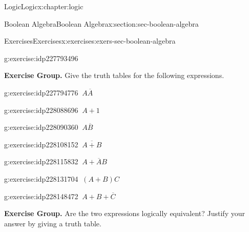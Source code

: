 \documentclass[twoside,10pt,]{book}
\numberwithin{equation}{section}
\begin{document}
\begin{chapterptx}{Logic}{}{Logic}{}{}{x:chapter:logic}
\begin{sectionptx}{Boolean Algebra}{}{Boolean Algebra}{}{}{x:section:sec-boolean-algebra}
\begin{exercises-subsection}{Exercises}{}{Exercises}{}{}{x:exercises:exers-sec-boolean-algebra}
\begin{exercisegroup}
\begin{divisionexerciseeg}{17}{}{}{g:exercise:idp227793496}
\begin{image}{0.3}{0.4}{0.3}%
%
\end{image}%
\end{divisionexerciseeg}%
\end{exercisegroup}
\par\medskip\noindent
\par\medskip\noindent%
\textbf{Exercise Group.}\space\space%
Give the truth tables for the following expressions.\begin{exercisegroup}
\begin{divisionexerciseeg}{18}{}{}{g:exercise:idp227794776}%
\(\ A\overline{A}\)\end{divisionexerciseeg}%
\begin{divisionexerciseeg}{19}{}{}{g:exercise:idp228088696}%
\(\ A+1\)\end{divisionexerciseeg}%
\begin{divisionexerciseeg}{20}{}{}{g:exercise:idp228090360}%
\(\ A\overline{B}\)\end{divisionexerciseeg}%
\begin{divisionexerciseeg}{21}{}{}{g:exercise:idp228108152}%
\(\ \overline{A+B}\)\end{divisionexerciseeg}%
\begin{divisionexerciseeg}{22}{}{}{g:exercise:idp228115832}%
\(\ A+\overline{A}{}B\)\end{divisionexerciseeg}%
\begin{divisionexerciseeg}{23}{}{}{g:exercise:idp228131704}%
\(\ (A+B)C\)\end{divisionexerciseeg}%
\begin{divisionexerciseeg}{24}{}{}{g:exercise:idp228148472}%
\(\ A+B+\overline{C}\)\end{divisionexerciseeg}%
\end{exercisegroup}
\par\medskip\noindent
\par\medskip\noindent%
\textbf{Exercise Group.}\space\space%
Are the two expressions logically equivalent?  Justify your answer by giving a truth table.\begin{exercisegroup}

\end{exercisegroup}
\end{exercises-subsection}
\end{sectionptx}
\end{chapterptx}
\end{document}
